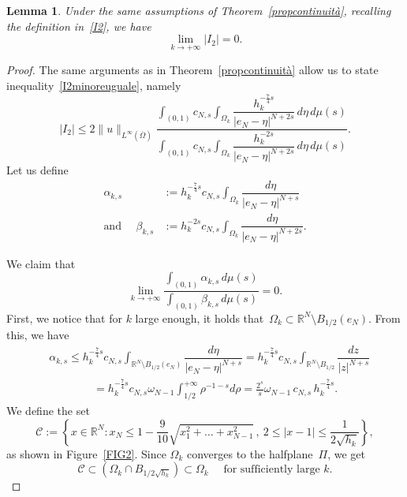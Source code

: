 \documentclass[12pt,a4paper,intlimits,sumlimits]{amsart}
\def \R {\mathbb{R}}
\theoremstyle{definition}
\theoremstyle{plain}
\newtheorem{lemma}[definition]{Lemma}
\numberwithin{equation}{section}
\renewcommand{\leq}{\leqslant}
\renewcommand{\le}{\leqslant}
\begin{document}
\begin{appendix}
\begin{lemma}
Under the same assumptions of Theorem~\ref{propcontinuità},  recalling the definition in~\eqref{I2}, we have
\[
\lim_{k\to+\infty} |I_2| =0.
\]
\end{lemma}

\begin{proof}
The same arguments as in Theorem~\ref{propcontinuità} allow us to state inequality~\eqref{I2minoreuguale}, namely
\[
|I_2|\leq 2\|u\|_{L^\infty(\overline{\Omega})}
\dfrac{\displaystyle\int_{(0,1)}c_{N,s}\int_{\Omega_k}\dfrac{h_k^{-\frac{7}{4}s}}{|e_N-\eta|^{N+2s}}\,d\eta\,d\mu(s)}{\displaystyle\int_{(0,1)}c_{N,s}\int_{\Omega_k}\dfrac{h_k^{-2s}}{|e_N-\eta|^{N+2s}}\,d\eta\,d\mu(s)}.
\]
Let us define
\begin{align}\label{alphaks}
\alpha_{k, s}&:= h_k^{-\frac74 s} c_{N, s} \int_{\Omega_k}\dfrac{d\eta}{|e_N-\eta|^{N+s}}
\\ {\mbox{and }}\quad
\label{betalphaks}
\beta_{k, s}&:= h_k^{-2s} c_{N, s} \int_{\Omega_k}\dfrac{d\eta}{|e_N-\eta|^{N+2s}}.
\end{align}

We claim that 
\begin{equation}\label{claimappendix}
\lim_{k\to +\infty} \dfrac{\displaystyle\int_{(0,1)} \alpha_{k, s} \, d\mu(s)}{\displaystyle\int_{(0,1)}\beta_{k, s} \, d\mu(s)} = 0.
\end{equation}
First, we notice that for $k$ large enough, it holds that~$
\Omega_k \subset \R^N\setminus B_{1/2}(e_N)$.
{F}rom this, we have
\begin{equation}\label{alphaksminore}
\begin{split}&
\alpha_{k, s}\le h_k^{-\frac74 s} c_{N, s} \int_{\R^N\setminus B_{1/2}(e_N)}\dfrac{d\eta}{|e_N-\eta|^{N+s}} = h_k^{-\frac74 s} c_{N, s} \int_{\R^N\setminus B_{1/2}} \dfrac{dz}{|z|^{N+s}}\\
&\qquad\qquad= h_k^{-\frac74 s} c_{N, s} \omega_{N-1} \int_{1/2}^{+\infty} \rho^{-1-s} d\rho= \frac{2^s}{s} \omega_{N-1}\, c_{N, s}\, h_k^{-\frac74 s}.
\end{split}
\end{equation}
We define the set
\[
\mathcal C:=\left\{x\in\R^N: x_N\le 1-\frac{9}{10}\sqrt{x_1^2 +\dots+x^2_{N-1}} \,, \ 2\le |x-1|\le \frac{1}{2\sqrt{h_k}} \right\},
\]
as shown in Figure~\ref{FIG2}. Since $\Omega_k$ converges to the halfplane~$\Pi$, we get
\[
\mathcal C \subset \left(\Omega_k\cap B_{1/2\sqrt{h_k}}\right) \subset\Omega_k\quad\mbox{ for sufficiently large } k.
\]


\end{proof}
\end{appendix}
\end{document}
